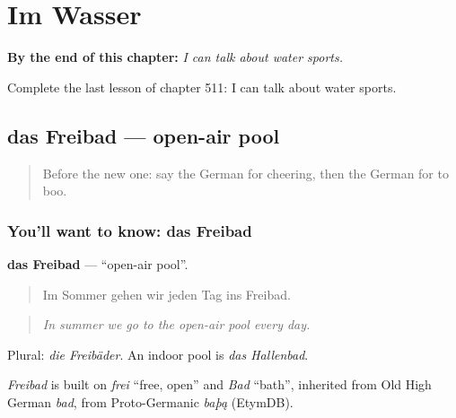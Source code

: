 
\chapter{Im Wasser}
\label{ch:ge-im-wasser}

\begin{chapteropening}
\textbf{By the end of this chapter:} \emph{I can talk about water sports.}

Complete the last lesson of chapter 511: I can talk about water sports.
\end{chapteropening}

\section[das Freibad]{das Freibad — open-air pool}

\label{lesson:GE-C511-freibad}



\begin{quote}
Before the new one: say the German for cheering, then the German for to boo.
\end{quote}

\subsection*{You'll want to know: das Freibad}
\textbf{das Freibad} — \textquotedblleft{}open-air pool\textquotedblright{}.

\begin{quote}
Im Sommer gehen wir jeden Tag ins Freibad.
\end{quote}

\begin{quote}
\emph{In summer we go to the open-air pool every day.}
\end{quote}

Plural: \emph{die Freibäder}. An indoor pool is \emph{das Hallenbad}.

\begin{cousinweb}
\emph{Freibad} is built on \emph{frei} \textquotedblleft{}free, open\textquotedblright{} and \emph{Bad} \textquotedblleft{}bath\textquotedblright{}, inherited from Old High German \emph{bad}, from Proto-Germanic \emph{baþą} (EtymDB).
\end{cousinweb}

